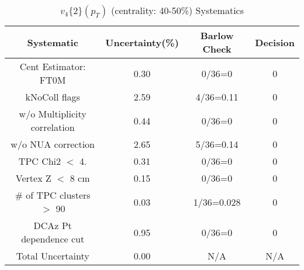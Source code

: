 \begin{table}[htbp]
\caption{$v_4\{2\}(p_{T})$ (centrality: 40-50\%) Systematics}
\label{tab:Sys_pTDiffv4}
\centering
\begin{tabular}{|c|c|c|c|}
\hline
Systematic & Uncertainty(\%) & Barlow Check & Decision \\
\hline
Cent Estimator: FT0M & 0.30 & 0/36=0 & 0 \\
kNoColl flags & 2.59 & 4/36=0.11 & 0 \\
w/o Multiplicity correlation & 0.44 & 0/36=0 & 0 \\
w/o NUA correction & 2.65 & 5/36=0.14 & 0 \\
TPC Chi2 $<$ 4. & 0.31 & 0/36=0 & 0 \\
Vertex Z $<$ 8 cm & 0.15 & 0/36=0 & 0 \\
\# of TPC clusters $>$ 90 & 0.03 & 1/36=0.028 & 0 \\
DCAz Pt dependence cut & 0.95 & 0/36=0 & 0 \\
\hline
Total Uncertainty & 0.00 & N/A & N/A \\
\hline
\end{tabular}
\end{table}
